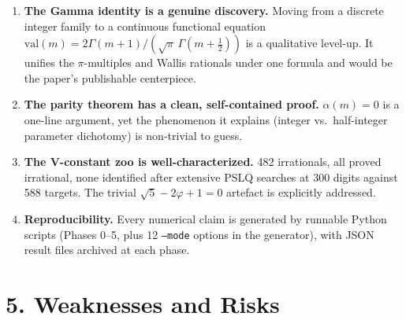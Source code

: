 \documentclass[11pt]{article}
\begin{document}
\begin{enumerate}[leftmargin=1.5em]
\item \textbf{The Gamma identity is a genuine discovery.}
  Moving from a discrete integer family to a continuous functional equation
  $\mathrm{val}(m) = 2\Gamma(m{+}1)/(\sqrt\pi\,\Gamma(m{+}\tfrac12))$
  is a qualitative level-up.  It unifies the $\pi$-multiples and Wallis rationals
  under one formula and would be the paper's publishable centerpiece.

\item \textbf{The parity theorem has a clean, self-contained proof.}
  $\alpha(m) = 0$ is a one-line argument, yet the phenomenon it explains
  (integer vs.\ half-integer parameter dichotomy) is non-trivial to guess.

\item \textbf{The V-constant zoo is well-characterized.}
  482 irrationals, all proved irrational, none identified after extensive
  PSLQ searches at 300 digits against 588 targets.
  The trivial $\sqrt5 - 2\varphi + 1 = 0$ artefact is explicitly addressed.

\item \textbf{Reproducibility.}
  Every numerical claim is generated by runnable Python scripts
  (Phases 0--5, plus 12 \texttt{--mode} options in the generator),
  with JSON result files archived at each phase.
\end{enumerate}

\section*{5. Weaknesses and Risks}
\end{document}
